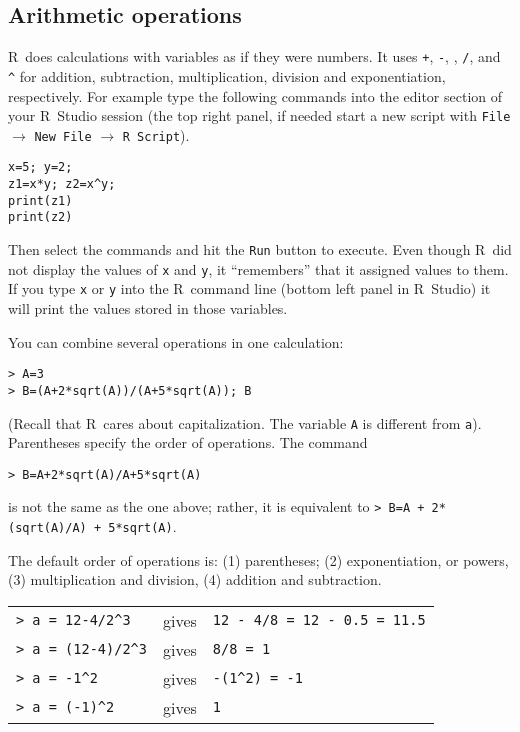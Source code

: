 \documentclass [11pt]{article}
\newcommand{\code}[1]{{\tt #1}}
\newcommand\R{{\sf R}}
\numberwithin{exercise}{section}
\begin{document}
\subsection{Arithmetic operations}
\R\ does calculations with variables as if they were numbers. It uses  
\code{+}, \code{-}, \code{*}, \code{/}, and \verb!^!
for addition, subtraction, multiplication, division and 
exponentiation, respectively. 
For example type the following commands into the editor section of your \R\ Studio session (the top right panel, if needed start a new script with \code{File} $\rightarrow$ \code{New File} $\rightarrow$ \code{R Script}). 
\vspace{-0.1in}
\begin{verbatim}
x=5; y=2;
z1=x*y; z2=x^y;
print(z1)
print(z2)
\end{verbatim}
\vspace{-0.1in}
Then select the commands and hit the \code{Run} button to execute.
Even though \R\ did not display the values of \code{x} and \code{y}, it ``remembers'' that 
it assigned values to them. If you type \code{x} or \code{y} 
into the \R\ command line (bottom left panel in \R\ Studio) it will print the values stored in those variables. 



You can combine several operations in one calculation:
\vspace{-0.1in}
\begin{verbatim}
> A=3
> B=(A+2*sqrt(A))/(A+5*sqrt(A)); B
\end{verbatim}
\vspace{-0.1in}
(Recall that \R\ cares about capitalization. The variable \code{A} is different from \code{a}).
Parentheses specify the order of operations. 
The command
\vspace{-0.1in}
\begin{verbatim}
> B=A+2*sqrt(A)/A+5*sqrt(A)
\end{verbatim}
\vspace{-0.1in}
is not the same as the one above; rather, it is 
equivalent to \code{> B=A + 2*(sqrt(A)/A) + 5*sqrt(A)}.

The default order of operations is: (1) parentheses; (2) exponentiation, or powers, (3) multiplication 
and division, (4) addition and subtraction.

\begin{tabular}{lcl}
\verb!> a = 12-4/2^3! & gives  & \verb!12 - 4/8 = 12 - 0.5 = 11.5! \\
\verb!> a = (12-4)/2^3! & gives & \verb!8/8 = 1! \\
\verb!> a = -1^2!   &          gives  &  \verb!-(1^2) = -1! \\
\verb!> a = (-1)^2! &          gives  &  \verb!1!
\end{tabular} 
\end{document}
